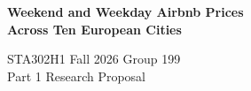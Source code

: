 \documentclass[11pt,letterpaper]{article}
\begin{document}
\begin{center}
  {\Large\bfseries Weekend and Weekday Airbnb Prices\\[3pt]
   Across Ten European Cities\par}
  \vspace{5pt}
  STA302H1 Fall 2026 \quad Group 199\\[2pt]
  Part 1 Research Proposal
\end{center}
\vspace{4pt}



\clearpage


\clearpage

\FloatBarrier%

\FloatBarrier%
\clearpage

\end{document}
